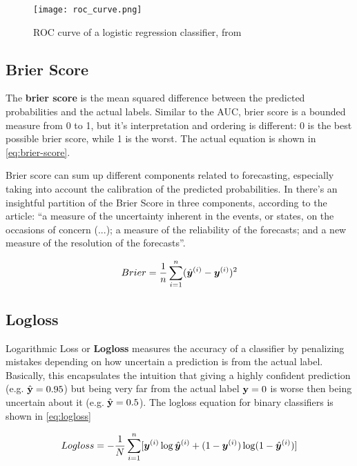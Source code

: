 \begin{figure}[!h]
    \centering
    \texttt{[image: roc\_curve.png]} 
    \caption{ROC curve of a logistic regression classifier, from \cite{kuhn2013applied}}
    \label{fig:auroc}
\end{figure}

\subsection{Brier Score}

The \textbf{brier score} is the mean squared difference between the predicted probabilities and the actual labels. Similar to the AUC, brier score is a bounded measure from 0 to 1, but it's interpretation and ordering is different: 0 is the best possible brier score, while 1 is the worst. The actual equation is shown in \ref{eq:brier-score}.

Brier score can sum up different components related to forecasting, especially taking into account the calibration of the predicted probabilities. In \cite{murphy1973new} there's an insightful partition of the Brier Score in three components, according to the article: ``a measure of the uncertainty inherent in the events, or states, on the occasions of concern (...); a measure of the reliability of the forecasts; and  a new measure of the resolution of the forecasts''.

\begin{equation}\label{eq:brier-score}
    Brier=\frac{1}{n}\sum_{i=1}^{n}(\hat{\bm{y}}^{(i)} - \bm{y}^{(i)})^2
\end{equation}

\subsection{Logloss}

Logarithmic Loss or \textbf{Logloss} measures the accuracy of a classifier by penalizing mistakes depending on how uncertain a prediction is from the actual label. Basically, this encapsulates the intuition that giving a highly confident prediction (e.g. $\hat{\textbf{{\text{\textup{y}}}}} = 0.95$) but being very far from the actual label $\textbf{\text{\textup{y}}} = 0$ is worse then being uncertain about it (e.g.  $\hat{\textbf{{\text{\textup{y}}}}} = 0.5$). The logloss equation for binary classifiers is shown in \ref{eq:logloss}

\begin{equation}\label{eq:logloss}
    Logloss = -\frac{1}{N}\sum_{i=1}^{n}[\bm{y}^{(i)} \log \hat{\bm{y}}^{(i)} + (1 - \bm{y}^{(i)})\log(1 - \hat{\bm{y}}^{(i)})]
\end{equation}




